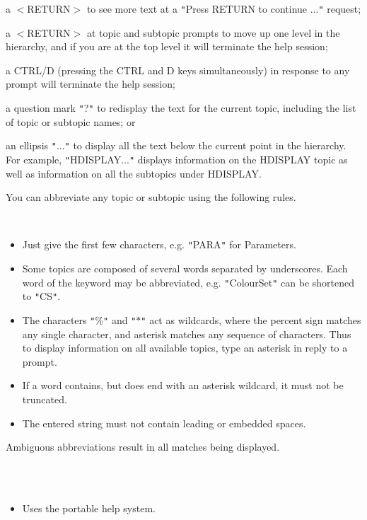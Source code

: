\documentclass[twoside,11pt]{article}
\renewcommand{\_}{\texttt{\symbol{95}}}
\newcommand{\sstimplementationstatus}[1]{
   \item[{Implementation Status:}] \mbox{} \\[1.3ex] #1}
\newcommand{\sstitemlist}[1]{
  \mbox{} \\
  \vspace{-3.5ex}
  \begin{itemize}
     #1
  \end{itemize}
}
\newcommand{\sstitem}{\item}
\newcommand{\sstimplementationstatus}[1]{
      \item[Implementation Status:] #1
   }
\newcommand{\sstitemlist}[1]{
      \begin{itemize}
         #1
      \end{itemize}
      \\
   }
\newcommand{\sstitem}{\item}
\begin{document}
{{{         \sstitem
            a $<$RETURN$>$ to see more text at a {\tt "}Press RETURN to continue ...{\tt "}
               request;

         \sstitem
            a $<$RETURN$>$ at topic and subtopic prompts to move up one level
               in the hierarchy, and if you are at the top level it will
               terminate the help session;

         \sstitem
            a CTRL/D (pressing the CTRL and D keys simultaneously) in
               response to any prompt will terminate the help session;

         \sstitem
            a question mark {\tt "}?{\tt "} to redisplay the text for the current
               topic, including the list of topic or subtopic names; or

         \sstitem
            an ellipsis {\tt "}...{\tt "} to display all the text below the
               current point in the hierarchy.  For example, {\tt "}HDISPLAY...{\tt "}
               displays information on the HDISPLAY topic as well as
               information on all the subtopics under HDISPLAY.

      }
      You can abbreviate any topic or subtopic using the following
      rules.
      \sstitemlist{

         \sstitem
            Just give the first few characters, e.g. {\tt "}PARA{\tt "} for
               Parameters.

         \sstitem
            Some topics are composed of several words separated by
               underscores.  Each word of the keyword may be abbreviated,
               e.g. {\tt "}Colour\_Set{\tt "} can be shortened to {\tt "}C\_S{\tt "}.

         \sstitem
            The characters {\tt "}\%{\tt "} and {\tt "}$*${\tt "} act as wildcards, where the
               percent sign matches any single character, and asterisk
               matches any sequence of characters.  Thus to display
               information on all available topics, type an asterisk in
               reply to a prompt.

         \sstitem
            If a word contains, but does end with an asterisk wildcard,
               it must not be truncated.

         \sstitem
            The entered string must not contain leading or embedded
               spaces.

      }
      Ambiguous abbreviations result in all matches being displayed.
   }
   \sstimplementationstatus{
      \sstitemlist{

         \sstitem
         Uses the portable help system.
      }
   }
}
\end{document}
